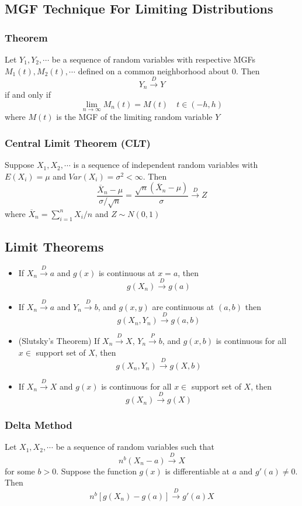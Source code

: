 \documentclass[11pt]{article}
\begin{document}
\subsection{MGF Technique For Limiting Distributions}
\subsubsection{Theorem}
Let $Y_1,Y_2,\cdots$ be a sequence of random variables with respective MGFs $M_1(t),M_2(t),\cdots$ defined on a common 
neighborhood about 0. Then \[Y_n\overset{D}{\rightarrow}Y\]
if and only if 
\[\lim_{n\to\infty}M_n(t) = M(t)\quad t\in(-h,h)\]
where $M(t)$ is the MGF of the limiting random variable $Y$
\subsubsection{Central Limit Theorem (CLT)}
Suppose $X_1,X_2,\cdots$ is a sequence of independent random variables with $E(X_i)=\mu$ and $Var(X_i)=\sigma^2<\infty$. 
Then \[\frac{\overline{X}_n-\mu}{\sigma/\sqrt{n}} = \frac{\sqrt{n}(\overline{X}_n-\mu)}{\sigma}\overset{D}{\rightarrow}Z\] 
where $\overline{X}_n = \sum_{i=1}^{n}X_i/n$ and $Z\sim N(0,1)$ 
\subsection{Limit Theorems}
\begin{itemize}
    \item If $X_n\overset{D}{\rightarrow}a$ and $g(x)$ is continuous at $x=a$, then \[g(X_n)\overset{D}{\rightarrow}g(a)\]
    \item If $X_n\overset{D}{\rightarrow}a$ and $Y_n\overset{D}{\rightarrow}b$, and $g(x,y)$ are continuous at $(a,b)$ then \[g(X_n,Y_n)\overset{D}{\rightarrow}g(a,b)\]
    \item (Slutsky's Theorem) If $X_n\overset{D}{\rightarrow}X$, $Y_n\overset{P}{\rightarrow}b$, and $g(x,b)$ is continuous for all $x\in$ support set of $X$, then \[g(X_n,Y_n)\overset{D}{\rightarrow}g(X,b)\]
    \item If $X_n\overset{D}{\rightarrow}X$ and $g(x)$ is continuous for all $x\in$ support set of $X$, then \[g(X_n)\overset{D}{\rightarrow}g(X)\] 
\end{itemize}
\subsubsection{Delta Method}
Let $X_1,X_2,\cdots$ be a sequence of random variables such that 
\[n^b(X_n-a)\overset{D}{\rightarrow}X\] 
for some $b>0$. Suppose the function $g(x)$ is differentiable at $a$ and $g'(a)\neq 0$. Then 
\[n^b\left[g(X_n)-g(a)\right]\overset{D}{\rightarrow}g'(a)X\] 
\end{document}
